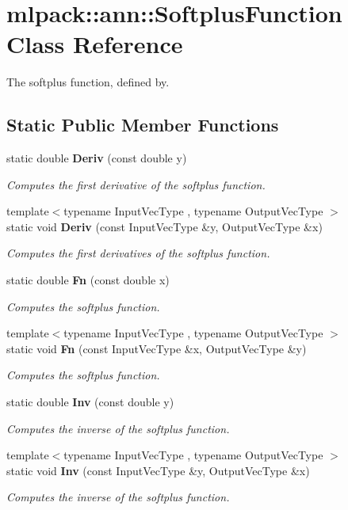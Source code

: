 \section{mlpack\+:\+:ann\+:\+:Softplus\+Function Class Reference}
\label{classmlpack_1_1ann_1_1SoftplusFunction}


The softplus function, defined by.  


\subsection*{Static Public Member Functions}
\begin{DoxyCompactItemize}
\item 
static double {\bf Deriv} (const double y)
\begin{DoxyCompactList}\small\item\em Computes the first derivative of the softplus function. \end{DoxyCompactList}\item 
{\footnotesize template$<$typename Input\+Vec\+Type , typename Output\+Vec\+Type $>$ }\\static void {\bf Deriv} (const Input\+Vec\+Type \&y, Output\+Vec\+Type \&x)
\begin{DoxyCompactList}\small\item\em Computes the first derivatives of the softplus function. \end{DoxyCompactList}\item 
static double {\bf Fn} (const double x)
\begin{DoxyCompactList}\small\item\em Computes the softplus function. \end{DoxyCompactList}\item 
{\footnotesize template$<$typename Input\+Vec\+Type , typename Output\+Vec\+Type $>$ }\\static void {\bf Fn} (const Input\+Vec\+Type \&x, Output\+Vec\+Type \&y)
\begin{DoxyCompactList}\small\item\em Computes the softplus function. \end{DoxyCompactList}\item 
static double {\bf Inv} (const double y)
\begin{DoxyCompactList}\small\item\em Computes the inverse of the softplus function. \end{DoxyCompactList}\item 
{\footnotesize template$<$typename Input\+Vec\+Type , typename Output\+Vec\+Type $>$ }\\static void {\bf Inv} (const Input\+Vec\+Type \&y, Output\+Vec\+Type \&x)
\begin{DoxyCompactList}\small\item\em Computes the inverse of the softplus function. \end{DoxyCompactList}\end{DoxyCompactItemize}


